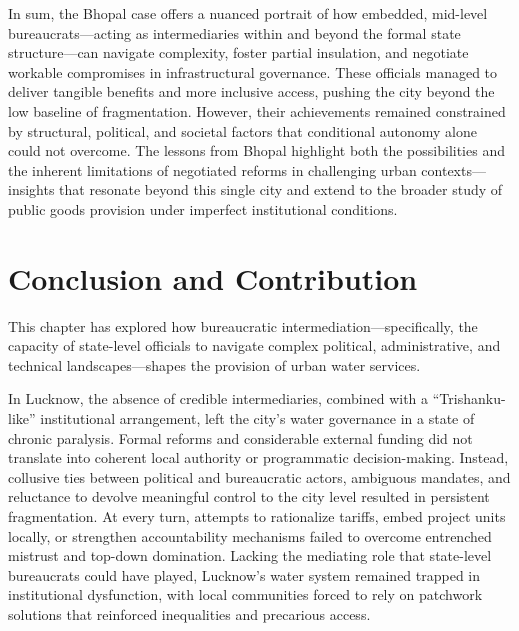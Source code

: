In sum, the Bhopal case offers a nuanced portrait of how embedded, mid-level bureaucrats—acting as intermediaries within and beyond the formal state structure—can navigate complexity, foster partial insulation, and negotiate workable compromises in infrastructural governance. These officials managed to deliver tangible benefits and more inclusive access, pushing the city beyond the low baseline of fragmentation. However, their achievements remained constrained by structural, political, and societal factors that conditional autonomy alone could not overcome. The lessons from Bhopal highlight both the possibilities and the inherent limitations of negotiated reforms in challenging urban contexts—insights that resonate beyond this single city and extend to the broader study of public goods provision under imperfect institutional conditions.

\section{Conclusion and Contribution}

This chapter has explored how bureaucratic intermediation—specifically, the capacity of state-level officials to navigate complex political, administrative, and technical landscapes—shapes the provision of urban water services.

In Lucknow, the absence of credible intermediaries, combined with a “Trishanku-like” institutional arrangement, left the city’s water governance in a state of chronic paralysis. Formal reforms and considerable external funding did not translate into coherent local authority or programmatic decision-making. Instead, collusive ties between political and bureaucratic actors, ambiguous mandates, and reluctance to devolve meaningful control to the city level resulted in persistent fragmentation. At every turn, attempts to rationalize tariffs, embed project units locally, or strengthen accountability mechanisms failed to overcome entrenched mistrust and top-down domination. Lacking the mediating role that state-level bureaucrats could have played, Lucknow’s water system remained trapped in institutional dysfunction, with local communities forced to rely on patchwork solutions that reinforced inequalities and precarious access.

